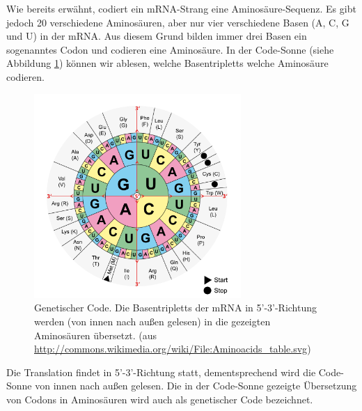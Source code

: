 Wie bereits erwähnt, codiert ein mRNA-Strang eine Aminosäure-Sequenz. Es gibt jedoch 20 verschiedene Aminosäuren, aber nur vier verschiedene Basen (A, C, G und U) in der mRNA. Aus diesem Grund bilden immer drei Basen ein sogenanntes Codon und codieren eine Aminosäure. In der Code-Sonne (siehe Abbildung \ref{fig:bio:pbsyn:codesonne}) können wir ablesen, welche Basentripletts welche Aminosäure codieren.


\begin{figure}[htb]
\begin{center}
\includegraphics[width=0.7\textwidth]{bilder/Genetischer_Code}
\end{center}
\caption[Genetischer Code. (aus \protect\url{http://commons.wikimedia.org/wiki/File:Aminoacids_table.svg})]{Genetischer Code. Die Basentripletts der mRNA in 5'-3'-Richtung werden (von innen nach außen gelesen) in die gezeigten Aminosäuren übersetzt. (aus \protect\url{http://commons.wikimedia.org/wiki/File:Aminoacids_table.svg})}

\label{fig:bio:pbsyn:codesonne}
\end{figure}

Die Translation findet in 5'-3'-Richtung statt, dementsprechend wird die Code-Sonne von innen nach außen gelesen. Die in der Code-Sonne gezeigte Übersetzung von Codons in Aminosäuren wird auch als genetischer Code bezeichnet.

